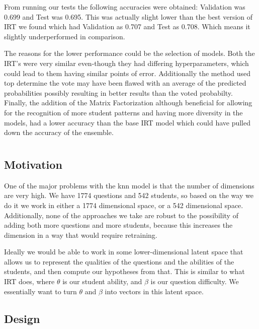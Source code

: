 \documentclass[twocolumn]{article}
\begin{document}
From running our tests the following accuracies were obtained: Validation was 0.699 and Test was 0.695. This was actually slight lower than the best version of IRT we found which had Validation as 0.707 and Test as 0.708.
Which means it slightly underperformed in comparison. 

The reasons for the lower performance could be the selection of models. Both the IRT’s were very similar even-though they had differing hyperparameters, which could lead to them having similar points of error. Additionally the method used top determine the vote may have been flawed with an average of the predicted probabilities possibly resulting in better results than the voted probabilty. Finally, the addition of the Matrix Factorization although beneficial for allowing for the recognition of more student patterns and having more diversity in the models, had a lower accuracy than the base IRT model which could have pulled down the accuracy of the ensemble. 



\section{}

\subsection{Motivation}

One of the major problems with the {\sc knn} model is that the number of
dimensions are very high. We have 1774 questions and 542 students, so based on
the way we do it we work in either a 1774 dimensional space, or a 542
dimensional space. Additionally, none of the approaches we take are robust to
the possibility of adding both more questions and more students, because this
increases the dimension in a way that would require retraining.

Ideally we would be able to work in some lower-dimensional latent space that
allows us to represent the qualities of the questions and the abilities of the
students, and then compute our hypotheses from that. This is similar to what
IRT does, where $\theta$ is our student ability, and $\beta$ is our question
difficulty. We essentially want to turn $\theta$ and $\beta$ into vectors in
this latent space.

\subsection{Design}
\end{document}
